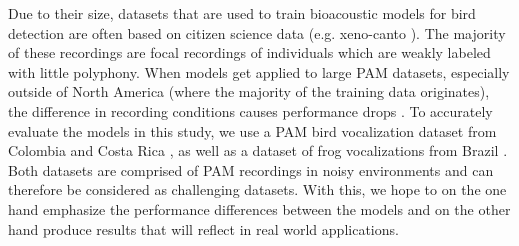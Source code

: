 Due to their size, datasets that are used to train bioacoustic models for bird detection are often based on citizen science data (e.g. xeno-canto \cite{xeno-canto_xeno-canto_2025}).
The majority of these recordings are focal recordings of individuals which are weakly labeled with little polyphony.
When models get applied to large PAM datasets, especially outside of North America (where the majority of the training data originates), the difference in recording conditions causes performance drops \cite{perez-granados_birdnet_2023}.
To accurately evaluate the models in this study, we use a PAM bird vocalization dataset from Colombia and Costa Rica \cite{vega-hidalgo_collection_2023}, as well as a dataset of frog vocalizations from Brazil \cite{canas_dataset_2023}.
Both datasets are comprised of PAM recordings in noisy environments and can therefore be considered as challenging datasets.
With this, we hope to on the one hand emphasize the performance differences between the models and on the other hand produce results that will reflect in real world applications.

